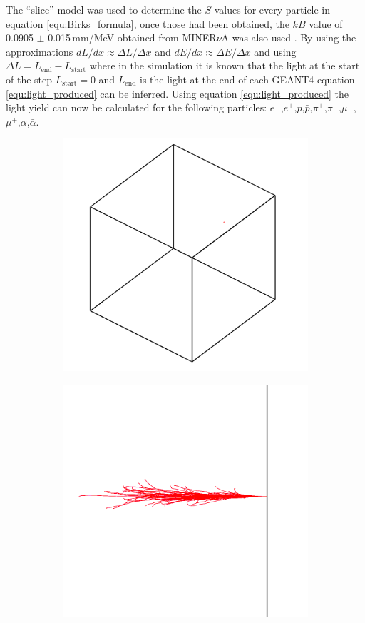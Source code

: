 The ``slice'' model was used to determine the $S$ values for every particle in equation \ref{equ:Birks_formula}, once those had been obtained, the $kB$ value of 0.0905 $\pm$ 0.015\,mm/MeV obtained from MINER$\nu$A was also used \cite{aliaga_2015}. By using the approximations $dL/dx \approx \Delta L / \Delta x$ and $dE/dx \approx \Delta E / \Delta x$ and using $\Delta L = L_{\textrm{end}} - L_{\textrm{start}} $ where in the simulation it is known that the light at the start of the step $L_{\textrm{start}} = 0$ and $L_{\textrm{end}}$ is the light at the end of each GEANT4 equation \ref{equ:light_produced} can be inferred. Using equation \ref{equ:light_produced} the light yield can now be calculated for the following particles: $e^-$,$e^+$,$p$,$\bar{p}$,$\pi^+$,$\pi^-$,$\mu^-$,$\mu^+$,$\alpha$,$\bar{\alpha}$.

\begin{figure}[!h]
\centering
\begin{subfigure}{.5\textwidth}
  \centering
  \includegraphics[width=0.7\linewidth]{Chapter4/Figs/newSlab3d950By900Red.png}
  \captionsetup{width=.9\linewidth}
  \caption{}
  \label{subFig:electronsSlab3d}
\end{subfigure}%
\begin{subfigure}{.5\textwidth}
  \centering
  \includegraphics[width=0.7\linewidth]{Chapter4/Figs/newSlabSideOnView950By900Red.png}

\end{subfigure}
\end{figure}
